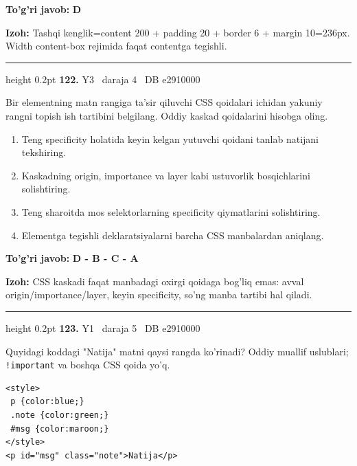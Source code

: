 \documentclass[10pt,a4paper,oneside]{article}
\begin{document}
\begin{tcolorbox}[enhanced,breakable,colback=teal!4,colframe=teal!45!black,boxrule=0.45pt,arc=1.2mm,left=2.8mm,right=2.8mm,top=2mm,bottom=2mm,before skip=2mm,after skip=2mm]
\textbf{\color{teal}To'g'ri javob:} \textbf{D}
\par\smallskip
\textbf{Izoh:} Tashqi kenglik=content 200 + padding 20 + border 6 + margin 10=236px. Width content-box rejimida faqat contentga tegishli.
\end{tcolorbox}
\vspace{2mm}\hrule height 0.2pt \vspace{4mm}
\hypertarget{q122}{\textbf{\color{ink}122.}}  {\color{muted}\scriptsize Y3 \textbullet\ daraja 4 \textbullet\ DB e2910000}
\par
Bir elementning matn rangiga ta'sir qiluvchi CSS qoidalari ichidan yakuniy rangni topish ish tartibini belgilang. Oddiy kaskad qoidalarini hisobga oling.
\begin{enumerate}[label=\Alph*),leftmargin=9mm]
\item Teng specificity holatida keyin kelgan yutuvchi qoidani tanlab natijani tekshiring.
\item Kaskadning origin, importance va layer kabi ustuvorlik bosqichlarini solishtiring.
\item Teng sharoitda mos selektorlarning specificity qiymatlarini solishtiring.
\item Elementga tegishli deklaratsiyalarni barcha CSS manbalardan aniqlang.
\end{enumerate}
\begin{tcolorbox}[enhanced,breakable,colback=teal!4,colframe=teal!45!black,boxrule=0.45pt,arc=1.2mm,left=2.8mm,right=2.8mm,top=2mm,bottom=2mm,before skip=2mm,after skip=2mm]
\textbf{\color{teal}To'g'ri javob:} \textbf{D - B - C - A}
\par\smallskip
\textbf{Izoh:} CSS kaskadi faqat manbadagi oxirgi qoidaga bog'liq emas: avval origin/importance/layer, keyin specificity, so'ng manba tartibi hal qiladi.
\end{tcolorbox}
\vspace{2mm}\hrule height 0.2pt \vspace{4mm}
\hypertarget{q123}{\textbf{\color{ink}123.}}  {\color{muted}\scriptsize Y1 \textbullet\ daraja 5 \textbullet\ DB e2910000}
\par
Quyidagi koddagi "Natija" matni qaysi rangda ko'rinadi? Oddiy muallif uslublari; \texttt{!important} va boshqa CSS qoida yo'q.\par
\begin{lstlisting}
<style>
 p {color:blue;}
 .note {color:green;}
 #msg {color:maroon;}
</style>
<p id="msg" class="note">Natija</p>
\end{lstlisting}
\end{document}

